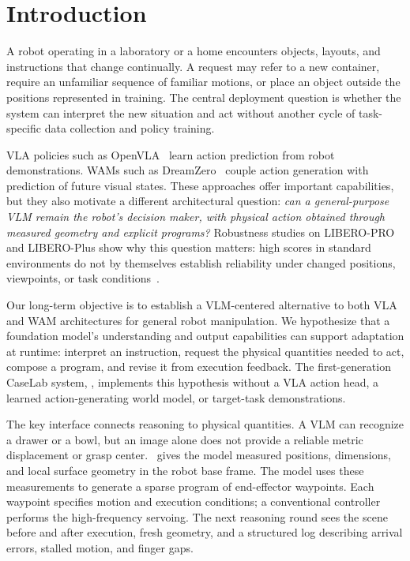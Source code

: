 \section{Introduction}
\label{sec:intro}

A robot operating in a laboratory or a home encounters objects, layouts, and instructions that change continually. A request may refer to a new container, require an unfamiliar sequence of familiar motions, or place an object outside the positions represented in training. The central deployment question is whether the system can interpret the new situation and act without another cycle of task-specific data collection and policy training.

VLA policies such as OpenVLA~\citep{kim2024openvla} learn action prediction from robot demonstrations. WAMs such as DreamZero~\citep{ye2026dreamzero} couple action generation with prediction of future visual states. These approaches offer important capabilities, but they also motivate a different architectural question: \emph{can a general-purpose VLM remain the robot's decision maker, with physical action obtained through measured geometry and explicit programs?} Robustness studies on LIBERO-PRO and LIBERO-Plus show why this question matters: high scores in standard environments do not by themselves establish reliability under changed positions, viewpoints, or task conditions~\citep{zhou2025liberopro,fei2025liberoplus}.

Our long-term objective is to establish a VLM-centered alternative to both VLA and WAM architectures for general robot manipulation. We hypothesize that a foundation model's understanding and output capabilities can support adaptation at runtime: interpret an instruction, request the physical quantities needed to act, compose a program, and revise it from execution feedback. The first-generation CaseLab system, \zyra, implements this hypothesis without a VLA action head, a learned action-generating world model, or target-task demonstrations.

The key interface connects reasoning to physical quantities. A VLM can recognize a drawer or a bowl, but an image alone does not provide a reliable metric displacement or grasp center. \zyra\ gives the model measured positions, dimensions, and local surface geometry in the robot base frame. The model uses these measurements to generate a sparse program of end-effector waypoints. Each waypoint specifies motion and execution conditions; a conventional controller performs the high-frequency servoing. The next reasoning round sees the scene before and after execution, fresh geometry, and a structured log describing arrival errors, stalled motion, and finger gaps.

